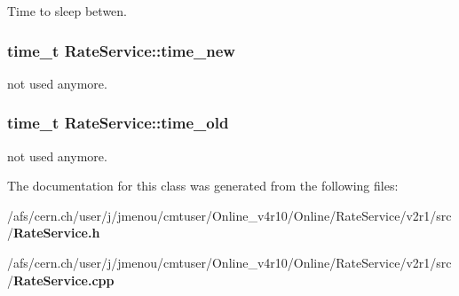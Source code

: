 Time to sleep betwen. 

\subsubsection{\setlength{\rightskip}{0pt plus 5cm}time\_\-t {\bf Rate\-Service::time\_\-new}\hspace{0.3cm}{\tt  [private]}}\label{classRateService_r6}


not used anymore. 

\subsubsection{\setlength{\rightskip}{0pt plus 5cm}time\_\-t {\bf Rate\-Service::time\_\-old}\hspace{0.3cm}{\tt  [private]}}\label{classRateService_r5}


not used anymore. 



The documentation for this class was generated from the following files:\begin{CompactItemize}
\item 
/afs/cern.ch/user/j/jmenou/cmtuser/Online\_\-v4r10/Online/Rate\-Service/v2r1/src/{\bf Rate\-Service.h}\item 
/afs/cern.ch/user/j/jmenou/cmtuser/Online\_\-v4r10/Online/Rate\-Service/v2r1/src/{\bf Rate\-Service.cpp}\end{CompactItemize}
